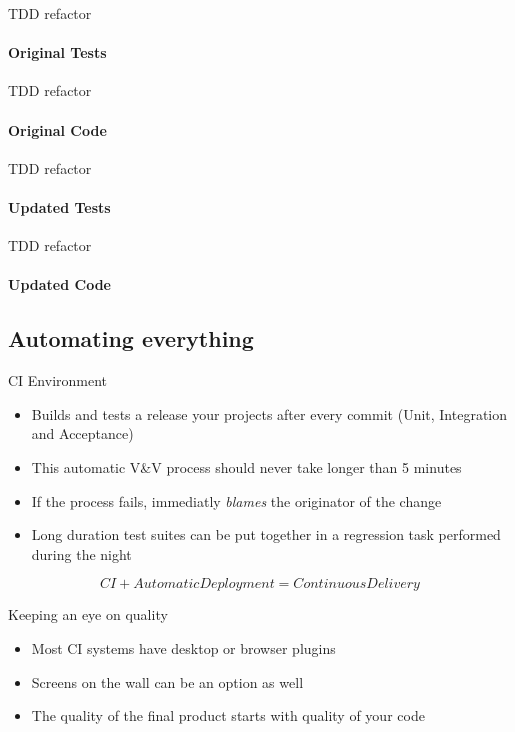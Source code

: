 \documentclass[]{beamer}
\begin{document}
\begin{frame}{TDD refactor}
    \framesubtitle{Original Tests}
    
\end{frame}

\begin{frame}{TDD refactor}
    \framesubtitle{Original Code}
    
\end{frame}

\begin{frame}{TDD refactor}
    \framesubtitle{Updated Tests}
    
\end{frame}

\begin{frame}{TDD refactor}
    \framesubtitle{Updated Code}
    
\end{frame}

\subsection*{Automating everything}
\label{automating_everything}

\begin{frame}{CI Environment}
    \begin{itemize}
    \item Builds and tests a release your projects after every commit (Unit, Integration and Acceptance)
    \pause
    \item This automatic V\&V process should never take longer than 5 minutes
    \pause
    \item If the process fails, immediatly \emph{blames} the originator of the change
    \pause
    \item Long duration test suites can be put together in a regression task performed during the night
    \end{itemize}
    \pause
    \begin{equation*}
    \boxed{CI + AutomaticDeployment = ContinuousDelivery}
    \end{equation*}
\end{frame}

\begin{frame}{Keeping an eye on quality}
    \begin{itemize}
    \item Most CI systems have desktop or browser plugins
    \pause
    \item Screens on the wall can be an option as well
    \pause
    \item The quality of the final product starts with quality of your code
    \end{itemize}
\end{frame}
\end{document}
